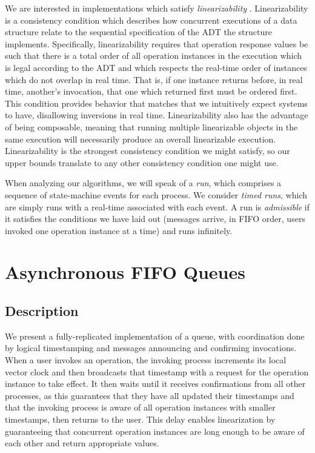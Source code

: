 \documentclass[a4paper,anonymous,USenglish]{lipics-v2021}
\theoremstyle{definition}
\begin{document}
We are interested in implementations which satisfy \emph{linearizability} \cite{HerlihyWing90}.  Linearizability is a consistency condition which describes how concurrent executions of a data structure relate to the sequential specification of the ADT the structure implements.  Specifically, linearizability requires that operation response values be such that there is a total order of all operation instances in the execution which is legal according to the ADT and which respects the real-time order of instances which do not overlap in real time.  That is, if one instance returns before, in real time, another's invocation, that one which returned first must be ordered first.  This condition provides behavior that matches that we intuitively expect systems to have, disallowing inversions in real time.  Linearizability also has the advantage of being composable, meaning that running multiple linearizable objects in the same execution will necessarily produce an overall linearizable execution.  Linearizability is the strongest consistency condition we might satisfy, so our upper bounds translate to any other consistency condition one might use.

When analyzing our algorithms, we will speak of a \emph{run}, which comprises a sequence of state-machine events for each process.  We consider \emph{timed runs}, which are simply runs with a real-time associated with each event.  A run is \emph{admissible} if it satisfies the conditions we have laid out (messages arrive, in FIFO order, users invoked one operation instance at a time) and runs infinitely.

\section{Asynchronous FIFO Queues}

\subsection{Description}

We present a fully-replicated implementation of a queue, with coordination done by logical timestamping and messages announcing and confirming invocations.  When a user invokes an operation, the invoking process increments its local vector clock and then broadcasts that timestamp with a request for the operation instance to take effect.  It then waits until it receives confirmations from all other processes, as this guarantees that they have all updated their timestamps and that the invoking process is aware of all operation instances with smaller timestamps, then returns to the user.  This delay enables linearization by guaranteeing that concurrent operation instances are long enough to be aware of each other and return appropriate values.
\end{document}
